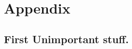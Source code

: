 \part{Appendix}
\label{part:appendix}

\chapter{First Unimportant stuff.}
\label{cha:first-unimp-stuff}

\blindtext

